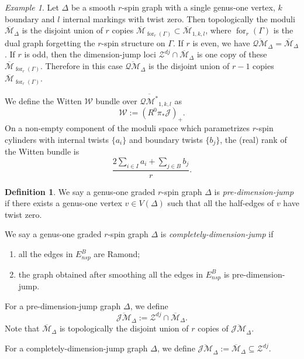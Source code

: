 \documentclass[11pt,a4paper]{article}
\theoremstyle{definition}
\newtheorem{dfn}[dummy]{Definition}
\theoremstyle{remark}
\newtheorem{ex}[dummy]{Example}
\newcommand{\oQMb}{{\overline{\mathcal{QM}}}}
\newcommand{\oJMb}{{\overline{\mathcal{JM}}}}
\numberwithin{equation}{section}
\def\Mbar{{\overline{\mathcal M}}}
\begin{document}
\begin{ex}\label{exa dim jump rank zero}
    Let $\Delta$ be a smooth $r$-spin graph with a single genus-one vertex, $k$ boundary and $l$ internal markings with twist zero. Then topologically the moduli $\Mbar_\Delta$ is the disjoint union of $r$ copies  $\Mbar_{\operatorname{for}_{r}(\Gamma)}\subset \Mbar_{1,k,l}$, where $\operatorname{for}_{r}(\Gamma)$ is the dual graph forgetting the $r$-spin structure on $\Gamma$. If $r$ is even, we have $\oQMb_\Delta=\Mbar_{\Delta}$. If $r$ is odd, then the dimension-jump loci $\mathcal Z^{dj}\cap\Mbar_\Delta$ is one copy of these $\Mbar_{\operatorname{for}_{r}(\Gamma)}$. Therefore in this case $\oQMb_\Delta$ is the disjoint union of $r-1$ copies  $\Mbar_{\operatorname{for}_{r}(\Gamma)}$.
\end{ex}

We define the Witten $\mathcal W$ bundle over $\overline{\mathcal{QM}^*}_{1,k,l}$ as 
$${\mathcal{W}}:= (R^0\pi_*\mathcal{J})_+.$$
On a non-empty component of the moduli space which parametrizes $r$-spin cylinders with internal twists $\{a_i\}$ and boundary twists $\{b_j\}$, the (real) rank of the Witten bundle is
\begin{equation}\label{eq rank of witten bundle g=1}\frac{2 \sum_{i\in I} a_i + \sum_{j\in B} b_j }{r}.\end{equation}

\begin{dfn}
    We say a genus-one graded $r$-spin graph $\Delta$ is \textit{pre-dimension-jump} if there exists a genus-one vertex $v\in V(\Delta)$ such that all the half-edges of $v$ have twist zero.

     We say a genus-one graded $r$-spin graph $\Delta$ is \textit{completely-dimension-jump} if
     \begin{enumerate}
         \item all the edges in $E^B_{nsp}$ are Ramond;
         \item the graph obtained after smoothing all the edges in $E^B_{nsp}$ is pre-dimension-jump.
     \end{enumerate}
\end{dfn}
For a pre-dimension-jump graph $\Delta$, we define
$$
\oJMb_\Delta:=\mathcal{Z}^{dj}\cap \Mbar_{\Delta}.
$$
Note that $\Mbar_{\Delta}$ is topologically the disjoint union of $r$ copies of  $\oJMb_\Delta$.

For a completely-dimension-jump graph $\Delta$, we define $\oJMb_\Delta:=\Mbar_{\Delta}\subseteq \mathcal Z^{dj}$.
\end{document}
